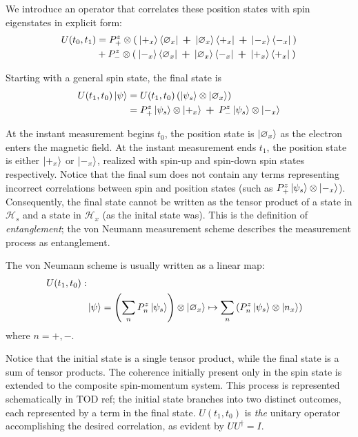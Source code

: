 We introduce an operator that correlates these position states with spin eigenstates in explicit form:
\begin{align} \label{eq: example 1 unitary operator}
  U(t_0, t_1) &= P^z_+ \otimes \left(\: \ket{+_x}\bra{\varnothing_x} \: \bm{+} \: \ket{\varnothing_x}\bra{+_x} \: \bm{+} \: \ket{-_x}\bra{-_x} \: \right) \\ \nonumber
  &+ P^z_- \otimes \left( \: \ket{-_x}\bra{\varnothing_x} \: \bm{+} \: \ket{\varnothing_x}\bra{-_x} \: \bm{+} \: \ket{+_x}\bra{+_x} \: \right)
\end{align}

Starting with a general spin state, the final state is
\begin{align} \label{eq: example 1 final state}
  U(t_1, t_0)\ket{\psi} & =  U(t_1, t_0) \left(\ket{\psi_s} \otimes \ket{\varnothing_x} \right) \\
  &= \nonumber P^z_+ \ket{\psi_s} \otimes \ket{+_x} \: \bm{+} \: P^z_- \ket{\psi_s} \otimes \ket{-_x}
\end{align}

At the instant measurement begins $t_0$, the position state is $\ket{\varnothing_x}$ as the electron enters the magnetic field. At the instant measurement ends $t_1$, the position state is either $\ket{+_x}$ or $\ket{-_x}$, realized with spin-up and spin-down spin states respectively. Notice that the final sum does not contain any terms representing incorrect correlations between spin and position states (such as $ P^z_+ \ket{\psi_s} \otimes \ket{-_x}$).  Consequently, the final state cannot be written as the tensor product of a state in $\mathcal{H}_s$ and a state in $\mathcal{H}_x$ (as the inital state was). This is the definition of \textit{entanglement}; the von Neumann measurement scheme describes the measurement process as entanglement.

The von Neumann scheme is usually written as a linear map:
\begin{align} \label{eq: general final state}
    \nonumber U(t_1, t_0): \\
    & \ket{\psi} = \left(\sum_{n} P^z_n\ket{\psi_s}\right) \otimes \ket{\varnothing_x} \mapsto \sum_{n}\left(P^z_n\ket{\psi_s} \otimes \ket{n_x}\right)
\end{align}
where $n = +, -$.

Notice that the initial state is a single tensor product, while the final state is a sum of tensor products. The coherence initially present only in the spin state is extended to the composite spin-momentum system. This process is represented schematically in TOD ref; the initial state branches into two distinct outcomes, each represented by a term in the final state. $U(t_1, t_0)$ is \textit{the} unitary operator accomplishing the desired correlation, as evident by $UU^\dagger = I$.

